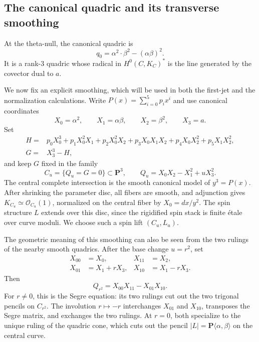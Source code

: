 \documentclass[11pt]{article}
\newcommand{\OO}{\mathcal O}
\begin{document}
\subsection{The canonical quadric and its transverse smoothing}
\label{subsec:quadric-smoothing}

At the theta-null, the canonical quadric is
\begin{equation}
\label{eq:q0-cyclic}
q_0
=
\alpha^2\cdot\beta^2-(\alpha\beta)^2.
\end{equation}
\begingroup
It is a rank-$3$ quadric whose radical in $H^0(C,K_C)^*$ is the line
generated by the covector dual to $a$.

We now fix an explicit smoothing, which will be used in both the
first-jet and the normalization calculations. Write
$P(x)=\sum_{i=0}^5p_ix^i$ and use canonical coordinates
\[
X_0=\alpha^2,\qquad X_1=\alpha\beta,\qquad
X_2=\beta^2,\qquad X_3=a.
\]
Set
\begin{equation}
\label{eq:fixed-homogeneous-cubic}
\begin{aligned}
H={}&p_0X_0^3+p_1X_0^2X_1+p_2X_0^2X_2
      +p_3X_0X_1X_2 +p_4X_0X_2^2+p_5X_1X_2^2, \\
G={}&X_3^3-H,
\end{aligned}
\end{equation}
and keep $G$ fixed in the family
\begin{equation}
\label{eq:explicit-Q-u}
C_u=\{Q_u=G=0\}\subset\mathbf P^3,
\qquad Q_u=X_0X_2-X_1^2+uX_3^2.
\end{equation}
The central complete intersection is the smooth canonical model of
$y^3=P(x)$. After shrinking the parameter disc, all fibers are smooth,
and adjunction gives $K_{C_u}\simeq\OO_{C_u}(1)$, normalized on the
central fiber by $X_0=dx/y^2$. The spin structure $L$ extends over
this disc, since the rigidified spin stack is finite \'etale over
curve moduli. We choose such a spin lift $(C_u,L_u)$.

\begingroup
The geometric meaning of this smoothing can also be seen from the
two rulings of the nearby smooth quadrics. After the base change
$u=r^2$, set
\begin{align*}
X_{00}&=X_0,
&
X_{11}&=X_2,
\\
X_{01}&=X_1+rX_3,
&
X_{10}&=X_1-rX_3.
\end{align*}
Then
\[
Q_{r^2}=X_{00}X_{11}-X_{01}X_{10}.
\]
For $r\neq0$, this is the Segre equation: its two rulings cut out
the two trigonal pencils on $C_{r^2}$. The involution $r\mapsto-r$
interchanges $X_{01}$ and $X_{10}$, transposes the Segre matrix,
and exchanges the two rulings. At $r=0$, both specialize to the
unique ruling of the quadric cone, which cuts out the pencil
$|L|=\mathbf P\langle\alpha,\beta\rangle$ on the central curve.
\end{document}
